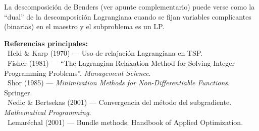 \documentclass[10pt,a4paper]{article}
\numberwithin{equation}{section}
\newenvironment{nota}{\begin{tcolorbox}[notebox]}{\end{tcolorbox}}
\begin{document}
\begin{nota}
  La descomposici\'on de Benders (ver apunte complementario) puede verse como la ``dual'' de la descomposici\'on Lagrangiana cuando se fijan variables complicantes (binarias) en el maestro y el subproblema es un LP.
\end{nota}

\vspace{12pt}
\begin{tcolorbox}[colback=sectionbg!8, colframe=sectionbg!40, boxrule=0.5pt, arc=3pt,
    left=8pt, right=8pt, top=6pt, bottom=6pt]
  {\small\sffamily\bfseries Referencias principales:}\\[3pt]
  {\footnotesize
    \textbullet\ Held \& Karp (1970) — Uso de relajaci\'on Lagrangiana en TSP.\\
    \textbullet\ Fisher (1981) — ``The Lagrangian Relaxation Method for Solving Integer Programming Problems''. \textit{Management Science}.\\
    \textbullet\ Shor (1985) — \textit{Minimization Methods for Non-Differentiable Functions}. Springer.\\
    \textbullet\ Nedic \& Bertsekas (2001) — Convergencia del m\'etodo del subgradiente. \textit{Mathematical Programming}.\\
    \textbullet\ Lemaréchal (2001) — Bundle methods. Handbook of Applied Optimization.
  }
\end{tcolorbox}
\end{document}
